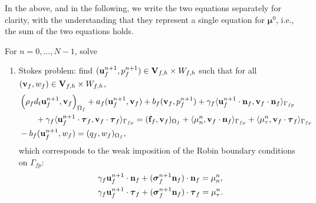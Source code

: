 \documentclass[11pt]{article}
\def\u{{\bf u}}
\def\bv{{\bf v}}
\def\n{{\bf n}}
\def\f{{\bf f}}
\def\btau{\boldsymbol{\tau}}
\def\bs{\boldsymbol{\sigma}}
\def\bmu{\boldsymbol{\mu}}
\def\V{{\bf V}}
\def\O{\Omega}
\def\<{\langle}
\def\>{\rangle}
\def\dt{d_t}
\begin{document}
In the above, and in the following, we write the two equations separately for clarity, with the understanding that they represent a single equation for $\bmu^0$, i.e., the sum of the two equations holds.

For $n = 0,\dots,N-1$, solve
%
\begin{enumerate}
\item Stokes problem: find $(\u_{f}^{n+1}, p_{f}^{n+1}) \in \V_{f,h}\times W_{f,h}$ such that for all $(\bv_f,w_f) \in \V_{f,h}\times W_{f,h}$,
%
\begin{align}
  & \left(\rho_f {\dt \u_{f}^{n+1}},\bv_{f}\right)_{\O_f} + a_{f}(\u_{f}^{n+1},\bv_{f}) + b_f(\bv_{f},p_{f}^{n+1}) + \gamma_f\<\u_f^{n+1}\cdot\n_f,\bv_f\cdot\n_f\>_{\Gamma_{fp}}
  \nonumber \\
  & \qquad  +  \gamma_f \<\u_f^{n+1}\cdot\btau_{f},\bv_f\cdot\btau_{f}\>_{\Gamma_{fp}} = (\f_{f},\bv_{f})_{\O_f} + \<\mu_n^n,\bv_f\cdot\n_{f}\>_{\Gamma_{fp}} 
   + \<\mu_{\tau}^n,\bv_f\cdot\btau_{f}\>_{\Gamma_{fp}}\label{stokes-weak-1}\\
 & - b_f(\u^{n+1}_{f},w_{f}) = (q_{f},w_{f})_{\O_f}, \label{stokes-weak-2}
\end{align}
%
which corresponds to the weak imposition of the Robin boundary conditions on $\Gamma_{fp}$:
%
\begin{subequations}\label{stokes-robin-mu-modif}
\begin{align}
  & \gamma_f\u_f^{n+1}\cdot\n_f + (\bs_f^{n+1} \n_f)\cdot\n_f = \mu_n^n, 
  \label{stokes-robin-mu-1-modif} \\
  &\gamma_f\u_f^{n+1}\cdot\btau_{f}
 +  (\bs_f^{n+1}\n_f)\cdot\btau_{f}
  = \mu_{\tau}^n. 
  \label{stokes-robin-mu-2-modif}
\end{align}
\end{subequations}
%


\end{enumerate}
\end{document}
